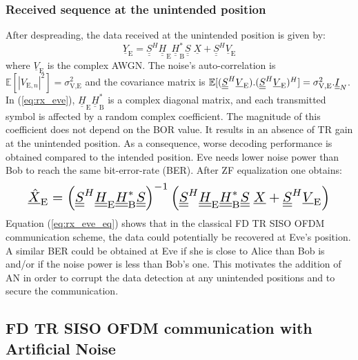 \documentclass[conference]{IEEEtran}
\begin{document}
\subsubsection{Received sequence at the unintended position}
After despreading, the data received at the unintended position is given by:
\begin{equation}
    \underline{Y}_{\text{E}}= \underline{\underline{S}}^H  \underline{\underline{H}}_{\text{E}} \underline{\underline{H}}^*_{\text{B}}  \underline{\underline{S}}\; \underline{X}  +  \underline{\underline{S}}^H  \underline{V}_\text{E}
    \label{eq:rx_eve}
\end{equation}
where $\underline{V}_\text{E}$ is the complex AWGN. The noise's auto-correlation is $\mathbb{E}[ \left|V_{\text{E},n}\right|^2 ] = \sigma_{\text{V,E}}^2$ and the covariance matrix is $\mathbb{E}[(\underline{\underline{S}}^H  \underline{V}_\text{E}) . (\underline{\underline{S}}^H \underline{V}_\text{E})^H ] = \sigma_{\text{V,E}}^2 . \underline{\underline{I}}_N$.  In (\ref{eq:rx_eve}), $\underline{\underline{H}}_{\text{E}} \underline{\underline{H}}^*_{\text{B}}$ is a complex diagonal matrix, and each transmitted symbol is affected by a random complex coefficient. The magnitude of this coefficient does not depend on the BOR value. It results in an absence of TR gain at the unintended position. As a consequence, worse decoding performance is obtained compared to the intended position. Eve needs lower noise power than Bob to reach the same bit-error-rate (BER). After ZF equalization one obtains:
\begin{equation}\resizebox{0.91\hsize}{!}{$
    \underline{\hat{X}}_{\text{E}} = \left(\underline{\underline{S}}^H  \underline{\underline{H}}_{\text{E}} \underline{\underline{H}}^*_{\text{B}}\underline{\underline{S}}\right)^{-1} \left(\underline{\underline{S}}^H  \underline{\underline{H}}_{\text{E}} \underline{\underline{H}}^*_{\text{B}}\underline{\underline{S}}\; \underline{X} +  \underline{\underline{S}}^H \underline{V}_\text{E}\right)$}
    \label{eq:rx_eve_eq}
\end{equation}
Equation (\ref{eq:rx_eve_eq}) shows that in the classical FD TR SISO OFDM communication scheme, the data could potentially be recovered at Eve's position. A similar BER could be obtained at Eve if she is close to Alice than Bob is and/or if the noise power is less than Bob's one. This motivates the addition of AN in order to corrupt the data detection at any unintended positions and to secure the communication. 


\subsection{FD TR SISO OFDM communication with Artificial Noise}
\end{document}
